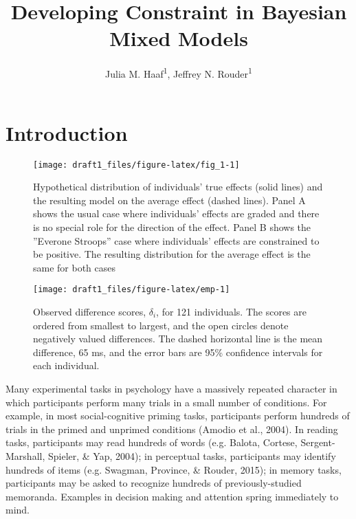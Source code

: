 \documentclass[american,man]{apa6}
\title{Developing Constraint in Bayesian Mixed Models}
\author{
          Julia M. Haaf\textsuperscript{1},
          Jeffrey N. Rouder\textsuperscript{1}  }
\affiliation{
    \vspace{0.5cm}
          \textsuperscript{1} University of Missouri  }
\begin{document}
\maketitle



\section{Introduction}\label{introduction}

\begin{figure}

{\centering \texttt{[image: draft1\_files/figure-latex/fig\_1-1]} 

}

\caption{Hypothetical distribution of individuals' true effects (solid lines) and the resulting model on the average effect (dashed lines).  Panel A shows the usual case where individuals' effects are graded and there is no special role for the direction of the effect.  Panel B shows the ''Everone Stroops'' case where individuals' effects are constrained to be positive.  The resulting distribution for the average effect is the same for both cases}\label{fig:fig_1}
\end{figure}

\begin{figure}

{\centering \texttt{[image: draft1\_files/figure-latex/emp-1]} 

}

\caption{Observed difference scores, $\delta_i$, for 121 individuals. The scores are ordered from smallest to largest, and the open circles denote negatively valued differences.  The dashed horizontal line is the mean difference, 65 ms, and the error bars are 95\% confidence intervals for each individual.}\label{fig:emp}
\end{figure}

Many experimental tasks in psychology have a massively repeated
character in which participants perform many trials in a small number of
conditions. For example, in most social-cognitive priming tasks,
participants perform hundreds of trials in the primed and unprimed
conditions (Amodio et al., 2004). In reading tasks, participants may
read hundreds of words (e.g. Balota, Cortese, Sergent-Marshall, Spieler,
\& Yap, 2004); in perceptual tasks, participants may identify hundreds
of items (e.g. Swagman, Province, \& Rouder, 2015); in memory tasks,
participants may be asked to recognize hundreds of previously-studied
memoranda. Examples in decision making and attention spring immediately
to mind.
\end{document}
